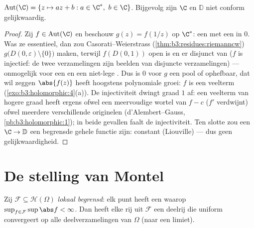 \begin{theorem}
\label{thm:b3:conformal:autplane}
$\operatorname{Aut}(\C) = \{z \mapsto az + b : a \in \C^*,\ b \in
\C\}$. Bijgevolg zijn $\C$ en $\mathbb D$ niet conform
gelijkwaardig.
\end{theorem}

\begin{proof}
Zij $f \in \operatorname{Aut}(\C)$ en beschouw $g(z) = f(1/z)$ op
$\C^*$: een  met een 
in $0$. Was ze essentieel, dan zou Casorati--Weierstrass
(\cref{thm:b3:residues:riemanncw})
$g\bigl(D(0,\varepsilon)\setminus\{0\}\bigr)$  maken,
terwijl $f(D(0, 1))$ open is en er disjunct van ($f$ is
injectief: de twee verzamelingen zijn beelden van disjuncte
verzamelingen) --- onmogelijk voor een  en een
niet-lege . Dus is $0$ voor $g$ een pool of
ophefbaar, dat wil zeggen $\abs{f(z)}$ heeft hoogstens
polynomiale groei: $f$ is een veelterm
(\cref{exo:b3:holomorphic:4}(a)). De injectiviteit dwingt graad
$1$ af: een veelterm van hogere graad heeft ergens ofwel een
meervoudige wortel van $f - c$ ($f'$ verdwijnt) ofwel meerdere
verschillende originelen (d'Alembert--Gauss,
\cref{pb:b3:holomorphic:1}); in beide gevallen faalt de
injectiviteit. Ten slotte zou een  $\C \to \mathbb D$ een
begrensde gehele functie zijn: constant (Liouville) --- dus geen
gelijkwaardigheid.
\end{proof}

\section{De stelling van Montel}

\begin{theorem}[Montel]\label{thm:b3:conformal:montel}
Zij $\mathcal F \subseteq \mathcal H(\Omega)$ \emph{lokaal
begrensd}: elk punt heeft een  waarop $\sup_{f\in
\mathcal F}\sup\abs f < \infty$. Dan heeft elke rij uit $\mathcal
F$ een deelrij die uniform convergeert op alle 
deelverzamelingen van $\Omega$ (naar een 
limiet).
\end{theorem}

